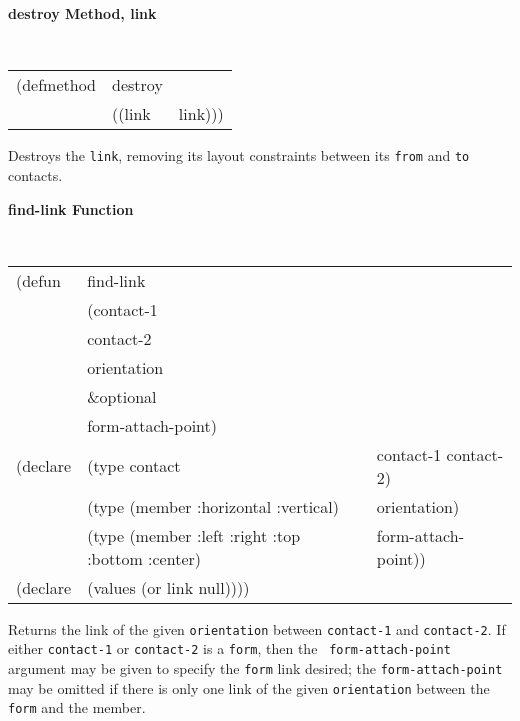 {\samepage
{\large {\bf destroy \hfill Method, link}} 
\begin{flushright} 
\parbox[t]{6.125in}{
\tt
\begin{tabular}{lll}
\raggedright
(defmethod & destroy & \\ 
& ((link & link))) \\
\end{tabular}
\rm

}\end{flushright}}

\begin{flushright} \parbox[t]{6.125in}{Destroys the {\tt link}, removing
its layout constraints between its {\tt from} and {\tt to} contacts.
}\end{flushright}

{\samepage
{\large {\bf find-link \hfill Function}} 
\begin{flushright} 
\parbox[t]{6.125in}{
\tt
\begin{tabular}{lll}
\raggedright
(defun & find-link & \\ 
& (contact-1 \\
&  contact-2 \\
&  orientation\\
& \&optional \\
&  form-attach-point)\\ 
(declare &(type contact &                       contact-1 contact-2)\\
	 &(type (member :horizontal :vertical)& orientation)\\
         &(type (member :left :right :top :bottom :center)& form-attach-point))\\
(declare &(values (or link null)))) \\
\end{tabular}
\rm

}\end{flushright}}



\begin{flushright} \parbox[t]{6.125in}{ Returns the link of the given
{\tt orientation} between {\tt contact-1} and {\tt contact-2}.  If
either {\tt contact-1} or {\tt contact-2} is a {\tt form}, then the {\tt
form-attach-point} argument may be given to specify the {\tt form} link
desired; the {\tt form-attach-point} may be omitted if there is only one
link of the given {\tt orientation} between the {\tt form} and the
member.

}\end{flushright}


